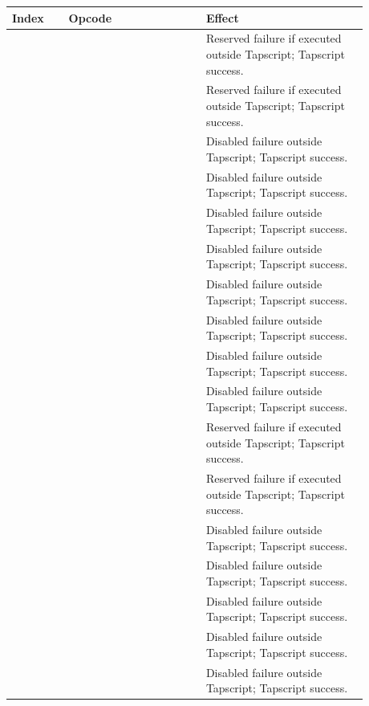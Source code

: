 \begin{longtable}{@{}L{0.14\linewidth}L{0.34\linewidth}L{0.40\linewidth}@{}}
\toprule
Index & Opcode & Effect \\
\midrule
{} &  & Reserved failure if executed outside Tapscript; Tapscript success. \\
 &  & Reserved failure if executed outside Tapscript; Tapscript success. \\
 &  & Disabled failure outside Tapscript; Tapscript success. \\
 &  & Disabled failure outside Tapscript; Tapscript success. \\
 &  & Disabled failure outside Tapscript; Tapscript success. \\
 &  & Disabled failure outside Tapscript; Tapscript success. \\
 &  & Disabled failure outside Tapscript; Tapscript success. \\
 &  & Disabled failure outside Tapscript; Tapscript success. \\
 &  & Disabled failure outside Tapscript; Tapscript success. \\
 &  & Disabled failure outside Tapscript; Tapscript success. \\
 &  & Reserved failure if executed outside Tapscript; Tapscript success. \\
 &  & Reserved failure if executed outside Tapscript; Tapscript success. \\
 &  & Disabled failure outside Tapscript; Tapscript success. \\
 &  & Disabled failure outside Tapscript; Tapscript success. \\
 &  & Disabled failure outside Tapscript; Tapscript success. \\
 &  & Disabled failure outside Tapscript; Tapscript success. \\
 &  & Disabled failure outside Tapscript; Tapscript success. \\

\end{longtable}
